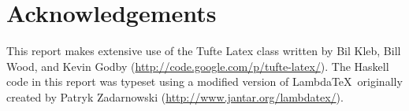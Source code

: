 \chapter{Acknowledgements}

\begin{fullwidth}

\lipsum[1]

\vspace{1em}\noindent
This report makes extensive use of the Tufte Latex class written by Bil Kleb, Bill Wood, and Kevin Godby (\url{http://code.google.com/p/tufte-latex/}). 
The Haskell code in this report was typeset using a modified version of Lambda\TeX\ originally created by Patryk Zadarnowski (\url{http://www.jantar.org/lambdatex/}).

\end{fullwidth}